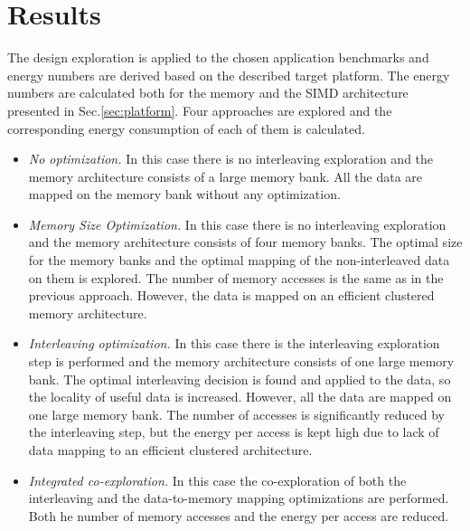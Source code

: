 \documentclass[prodmode,acmtodaes]{acmsmall}
\begin{document}
\section{Results}
\label{sec:results}


The design exploration is applied to the chosen application benchmarks and energy numbers are derived based on the described target platform.
The energy numbers are calculated both for the memory and the SIMD architecture presented in Sec.\ref{sec:platform}.
Four approaches are explored and the corresponding energy consumption of each of them is calculated.

\begin{itemize}
\item \textit{No optimization.} 
In this case there is no interleaving exploration and the memory architecture consists of a large memory bank. All the data are mapped on the memory bank without any optimization. 
\item \textit{Memory Size Optimization.} 
In this case there is no interleaving exploration and the memory architecture consists of four memory banks.
The optimal size for the memory banks and the optimal mapping of the non-interleaved data on them is explored. 
The number of memory accesses is the same as in the previous approach.
However, the data is mapped on an efficient clustered memory architecture.
\item \textit{Interleaving optimization.} 
In this case there is the  interleaving exploration step is performed and the memory architecture consists of one large memory bank.
The optimal interleaving decision is found and applied to the data, so the locality of useful data is increased.
However, all the data are mapped on one large memory bank.
The number of accesses is significantly reduced by the interleaving step, but the energy per access is kept high due to lack of data mapping to an efficient clustered architecture.
\item \textit{Integrated co-exploration.} 
In this case the co-exploration of both the interleaving and the data-to-memory mapping optimizations are performed.
Both he number of memory accesses and the energy per access are reduced.
\end{itemize}
\end{document}

